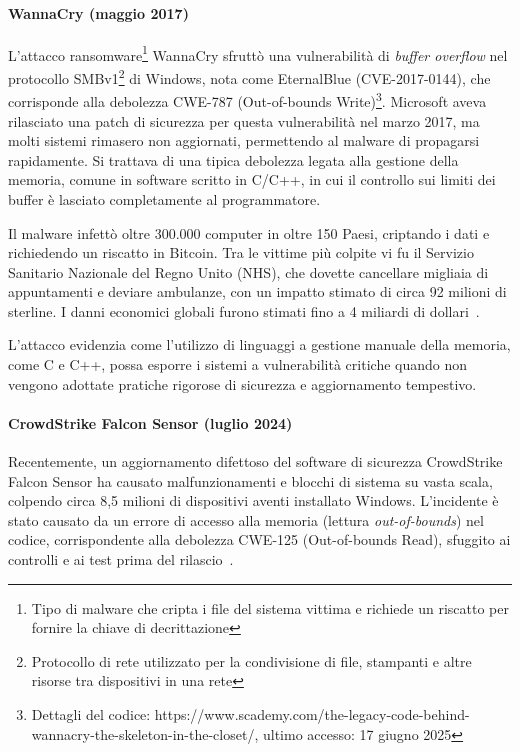 \paragraph{WannaCry (maggio 2017)}

L'attacco ransomware\footnote{Tipo di malware che cripta i file del sistema
vittima e richiede un riscatto per fornire la chiave di decrittazione} WannaCry
sfruttò una vulnerabilità di \textit{buffer overflow} nel protocollo SMBv1\footnote{Protocollo
di rete utilizzato per la condivisione di file, stampanti e altre risorse tra dispositivi
in una rete} di Windows, nota come EternalBlue (CVE-2017-0144), che corrisponde
alla debolezza CWE-787 (Out-of-bounds Write)\footnote{Dettagli del codice: https://www.scademy.com/the-legacy-code-behind-wannacry-the-skeleton-in-the-closet/,
ultimo accesso: 17 giugno 2025}. Microsoft aveva rilasciato una patch di
sicurezza per questa vulnerabilità nel marzo 2017, ma molti sistemi rimasero non
aggiornati, permettendo al malware di propagarsi rapidamente. Si trattava di una
tipica debolezza legata alla gestione della memoria, comune in software scritto
in C/C++, in cui il controllo sui limiti dei buffer è lasciato completamente al programmatore.

Il malware infettò oltre 300.000 computer in oltre 150 Paesi, criptando i dati e
richiedendo un riscatto in Bitcoin. Tra le vittime più colpite vi fu il Servizio
Sanitario Nazionale del Regno Unito (NHS), che dovette cancellare migliaia di
appuntamenti e deviare ambulanze, con un impatto stimato di circa 92 milioni di sterline.
I danni economici globali furono stimati fino a 4 miliardi di dollari~\cite{wannacry_kaspersky}.

L'attacco evidenzia come l'utilizzo di linguaggi a gestione manuale della memoria,
come C e C++, possa esporre i sistemi a vulnerabilità critiche quando non vengono
adottate pratiche rigorose di sicurezza e aggiornamento tempestivo.

\paragraph{CrowdStrike Falcon Sensor (luglio 2024)}

Recentemente, un aggiornamento difettoso del software di sicurezza CrowdStrike
Falcon Sensor ha causato malfunzionamenti e blocchi di sistema su vasta scala, colpendo
circa 8,5 milioni di dispositivi aventi installato Windows. L'incidente è stato
causato da un errore di accesso alla memoria (lettura \textit{out-of-bounds}) nel
codice, corrispondente alla debolezza CWE-125 (Out-of-bounds Read), sfuggito ai controlli
e ai test prima del rilascio~\cite{crowdstrike2024incident}.

